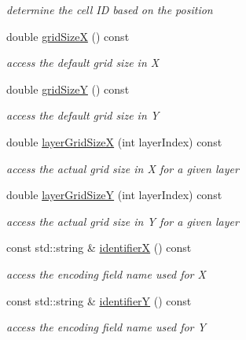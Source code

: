 \begin{DoxyCompactItemize}
\begin{DoxyCompactList}\small\item\em determine the cell ID based on the position \end{DoxyCompactList}\item 
double \hyperlink{class_d_d4hep_1_1_d_d_segmentation_1_1_tiled_layer_segmentation_aaf31f761a41c419918eea054b6a11cb8}{grid\+SizeX} () const
\begin{DoxyCompactList}\small\item\em access the default grid size in X \end{DoxyCompactList}\item 
double \hyperlink{class_d_d4hep_1_1_d_d_segmentation_1_1_tiled_layer_segmentation_aac9ed479ad94dbe1b8dc1328f3c3f894}{grid\+SizeY} () const
\begin{DoxyCompactList}\small\item\em access the default grid size in Y \end{DoxyCompactList}\item 
double \hyperlink{class_d_d4hep_1_1_d_d_segmentation_1_1_tiled_layer_segmentation_ad41cd4eaa02089ec707a7893d8f0845d}{layer\+Grid\+SizeX} (int layer\+Index) const
\begin{DoxyCompactList}\small\item\em access the actual grid size in X for a given layer \end{DoxyCompactList}\item 
double \hyperlink{class_d_d4hep_1_1_d_d_segmentation_1_1_tiled_layer_segmentation_a70bc0631f65102abda8962823ae90e1a}{layer\+Grid\+SizeY} (int layer\+Index) const
\begin{DoxyCompactList}\small\item\em access the actual grid size in Y for a given layer \end{DoxyCompactList}\item 
const std\+::string \& \hyperlink{class_d_d4hep_1_1_d_d_segmentation_1_1_tiled_layer_segmentation_aa9741a6cd5fa2e89e992315f65529fd9}{identifierX} () const
\begin{DoxyCompactList}\small\item\em access the encoding field name used for X \end{DoxyCompactList}\item 
const std\+::string \& \hyperlink{class_d_d4hep_1_1_d_d_segmentation_1_1_tiled_layer_segmentation_a005f04e6ac9dd696ff6cf0b6096114bd}{identifierY} () const
\begin{DoxyCompactList}\small\item\em access the encoding field name used for Y \end{DoxyCompactList}\item 

\end{DoxyCompactItemize}
